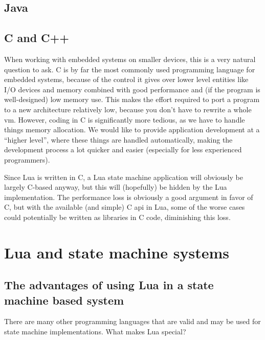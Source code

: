 \subsection{Java}
\label{sec:lua_vs_java}


\subsection{C and C++}
\label{sec:lua_vs_c}
When working with embedded systems on smaller devices, this is a very natural question to ask. C is by far the most commonly used programming language for embedded systems, because of the control it gives over lower level entities like I/O devices and memory combined with good performance and (if the program is well-designed) low memory use. This makes the effort required to port a program to a new architecture relatively low, because you don't have to rewrite a whole \gls{vm}. However, coding in C is significantly more tedious, as we have to handle things memory allocation. We would like to provide application development at a ``higher level'', where these things are handled automatically, making the development process a lot quicker and easier (especially for less experienced programmers).

Since Lua is written in C, a Lua state machine application will obviously be largely C-based anyway, but this will (hopefully) be hidden by the Lua implementation. The performance loss is obviously a good argument in favor of C, but with the available (and simple) C \gls{api} in Lua, some of the worse cases could potentially be written as libraries in C code, diminishing this loss.

\section{Lua and state machine systems}
\label{sec:lua_and_state_machines}

\subsection{The advantages of using Lua in a state machine based system}
\label{sec:lua_advantages}

There are many other programming languages that are valid and may be used for state machine implementations. What makes Lua special?

